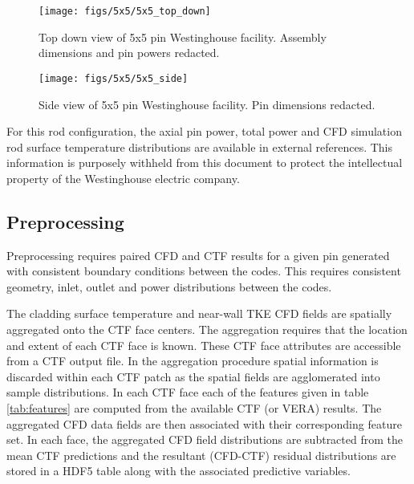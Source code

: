 \begin{figure}[H]
    \centering
    \texttt{[image: figs/5x5/5x5\_top\_down]}
    \caption[Top down view of 5x5 pin Westinghouse facility.]{Top down view of 5x5 pin Westinghouse facility.  Assembly dimensions and pin powers redacted.}
    \label{fig:5x5topdown}
\end{figure}

\begin{figure}[H]
    \centering
    \texttt{[image: figs/5x5/5x5\_side]}
    \caption[Side view of 5x5 pin Westinghouse facility.]{Side view of 5x5 pin Westinghouse facility.  Pin dimensions redacted.}
    \label{fig:5x5side}
\end{figure}

For this rod configuration, the axial pin power, total power and CFD simulation rod surface temperature distributions are available in external references.  This information is purposely withheld from this document to protect the intellectual property of the Westinghouse electric company.


\subsection{Preprocessing}
\label{sec:preprocessing}

Preprocessing requires paired CFD and CTF results for a given pin generated with consistent boundary conditions between the codes.  This requires consistent geometry, inlet, outlet and power distributions between the codes.

The cladding surface temperature and near-wall TKE CFD fields are spatially aggregated onto the CTF face centers.  The aggregation requires that the location and extent of each CTF face is known.  These CTF face attributes are accessible from a CTF output file.  In the aggregation procedure spatial information is discarded within each CTF patch as the spatial fields are agglomerated into sample distributions.
In each CTF face each of the features given in table \ref{tab:features} are computed from the available CTF (or VERA) results.
The aggregated CFD data fields are then associated with their corresponding feature set.
In each face, the aggregated CFD field distributions are subtracted from the mean CTF predictions and the resultant (CFD-CTF) residual distributions are stored in a HDF5 table along with the associated predictive variables.

